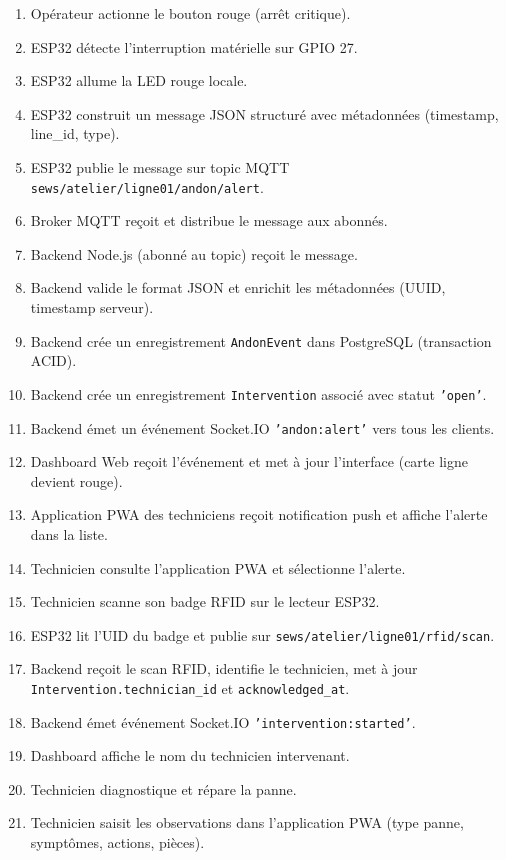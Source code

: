 \begin{enumerate}
    \item Opérateur actionne le bouton rouge (arrêt critique).
    \item ESP32 détecte l'interruption matérielle sur GPIO 27.
    \item ESP32 allume la LED rouge locale.
    \item ESP32 construit un message JSON structuré avec métadonnées (timestamp, line\_id, type).
    \item ESP32 publie le message sur topic MQTT \texttt{sews/atelier/ligne01/andon/alert}.
    \item Broker MQTT reçoit et distribue le message aux abonnés.
    \item Backend Node.js (abonné au topic) reçoit le message.
    \item Backend valide le format JSON et enrichit les métadonnées (UUID, timestamp serveur).
    \item Backend crée un enregistrement \texttt{AndonEvent} dans PostgreSQL (transaction ACID).
    \item Backend crée un enregistrement \texttt{Intervention} associé avec statut \texttt{'open'}.
    \item Backend émet un événement Socket.IO \texttt{'andon:alert'} vers tous les clients.
    \item Dashboard Web reçoit l'événement et met à jour l'interface (carte ligne devient rouge).
    \item Application PWA des techniciens reçoit notification push et affiche l'alerte dans la liste.
    \item Technicien consulte l'application PWA et sélectionne l'alerte.
    \item Technicien scanne son badge RFID sur le lecteur ESP32.
    \item ESP32 lit l'UID du badge et publie sur \texttt{sews/atelier/ligne01/rfid/scan}.
    \item Backend reçoit le scan RFID, identifie le technicien, met à jour \texttt{Intervention.technician\_id} et \texttt{acknowledged\_at}.
    \item Backend émet événement Socket.IO \texttt{'intervention:started'}.
    \item Dashboard affiche le nom du technicien intervenant.
    \item Technicien diagnostique et répare la panne.
    \item Technicien saisit les observations dans l'application PWA (type panne, symptômes, actions, pièces).

\end{enumerate}
